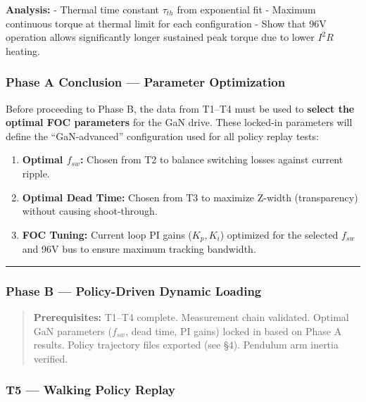 \documentclass[
]{article}
\providecommand{\tightlist}{%
  \setlength{\itemsep}{0pt}\setlength{\parskip}{0pt}}
\begin{document}
\textbf{Analysis:} - Thermal time constant \(\tau_{th}\) from
exponential fit - Maximum continuous torque at thermal limit for each
configuration - Show that 96V operation allows significantly longer
sustained peak torque due to lower \(I^2 R\) heating.

\subsubsection{Phase A Conclusion --- Parameter
Optimization}\label{phase-a-conclusion-parameter-optimization}

Before proceeding to Phase B, the data from T1--T4 must be used to
\textbf{select the optimal FOC parameters} for the GaN drive. These
locked-in parameters will define the ``GaN-advanced'' configuration used
for all policy replay tests:

\begin{enumerate}
\def\labelenumi{\arabic{enumi}.}
\tightlist
\item
  \textbf{Optimal \(f_{sw}\):} Chosen from T2 to balance switching
  losses against current ripple.
\item
  \textbf{Optimal Dead Time:} Chosen from T3 to maximize Z-width
  (transparency) without causing shoot-through.
\item
  \textbf{FOC Tuning:} Current loop PI gains (\(K_p, K_i\)) optimized
  for the selected \(f_{sw}\) and 96V bus to ensure maximum tracking
  bandwidth.
\end{enumerate}

\begin{center}\rule{0.5\linewidth}{0.5pt}\end{center}

\subsubsection{Phase B --- Policy-Driven Dynamic
Loading}\label{phase-b-policy-driven-dynamic-loading}

\begin{quote}
\textbf{Prerequisites:} T1--T4 complete. Measurement chain validated.
Optimal GaN parameters (\(f_{sw}\), dead time, PI gains) locked in based
on Phase A results. Policy trajectory files exported (see §4). Pendulum
arm inertia verified.
\end{quote}

\subsubsection{T5 --- Walking Policy
Replay}\label{t5-walking-policy-replay}
\end{document}
